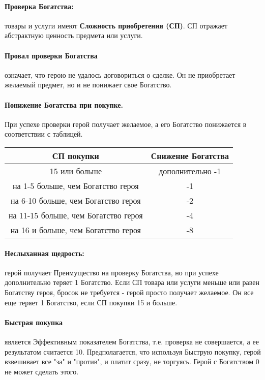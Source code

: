\paragraph{Проверка Богатства:} товары и услуги имеют \textbf{Сложность приобретения (СП)}. СП отражает абстрактную ценность предмета или услуги.
\paragraph{Провал проверки Богатства} означает, что герою не удалось договориться о сделке. Он не приобретает желаемый предмет, но и не понижает свое Богатство.
\paragraph{Понижение Богатства при покупке.} При успехе проверки герой получает желаемое, а его Богатство понижается в соответствии с таблицей.
\begin{center}\begin{tabular}{ |c|c| }\hline
    \textbf{СП покупки} & \textbf{Снижение Богатства} \\ \hline
    15 или больше & дополнительно -1 \\ \hline
    на 1-5 больше, чем Богатство героя & -1 \\ \hline
    на 6-10 больше, чем Богатство героя & -2 \\ \hline
    на 11-15 больше, чем Богатство героя & -4 \\ \hline
    на 16 и больше, чем Богатство героя & -8 \\ \hline
\end{tabular}\end{center}
\paragraph{Неслыханная щедрость:} герой получает Преимущество на проверку Богатства, но при успехе дополнительно теряет 1 Богатство.
Если СП товара или услуги меньше или равен Богатству героя, бросок не требуется - герой просто получает желаемое. Он все еще теряет 1 Богатство, если СП покупки 15 и больше.
\paragraph{Быстрая покупка} является Эффективным показателем Богатства, т.е. проверка не совершается, а ее результатом считается 10.  Предполагается, что используя Быструю покупку, герой взвешивает все "за" и "против", и платит сразу, не торгуясь. Герой с Богатством 0 не может сделать этого.
